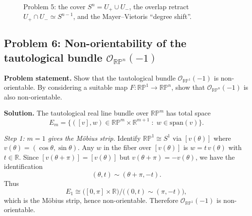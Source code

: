 \documentclass[12pt,a4paper]{article}
\theoremstyle{plain}
\theoremstyle{definition}      %
\begin{document}
\begin{figure}[H]
		\caption{Problem 5: the cover $S^n=U_+\cup U_-$, the overlap retract $U_+\cap U_-\simeq S^{n-1}$, and the Mayer--Vietoris ``degree shift''.}
	\end{figure}
	
	
	
	\subsection*{Problem 6: Non-orientability of the tautological bundle $\mathcal{O}_{\mathbb{RP}^n}(-1)$}
	
	\noindent \textbf{Problem statement.}
	Show that the tautological bundle $\mathcal{O}_{\mathbb{RP}^1}(-1)$ is non-orientable.
	By considering a suitable map $F:\mathbb{RP}^1\to\mathbb{RP}^n$, show that
	$\mathcal{O}_{\mathbb{RP}^n}(-1)$ is also non-orientable.
	
	\medskip
	\noindent \textbf{Solution.}
	The tautological real line bundle over $\mathbb{RP}^m$ has total space
	\[
	E_m=\{([v],w)\in \mathbb{RP}^m\times \mathbb{R}^{m+1}\;:\; w\in \mathrm{span}(v)\}.
	\]
	
	\smallskip
	\textit{Step 1: $m=1$ gives the Möbius strip.}
	Identify $\mathbb{RP}^1\cong S^1$ via $[v(\theta)]$ where $v(\theta)=(\cos\theta,\sin\theta)$.
	Any $w$ in the fiber over $[v(\theta)]$ is $w=t\,v(\theta)$ with $t\in\mathbb{R}$.
	Since $[v(\theta+\pi)]=[v(\theta)]$ but $v(\theta+\pi)=-v(\theta)$, we have the identification
	\[
	(\theta,t)\sim(\theta+\pi,-t).
	\]
	Thus
	\[
	E_1 \cong \big([0,\pi]\times\mathbb{R}\big)\big/\big((0,t)\sim(\pi,-t)\big),
	\]
	which is the Möbius strip, hence non-orientable. Therefore $\mathcal{O}_{\mathbb{RP}^1}(-1)$ is non-orientable.
	
\end{document}
